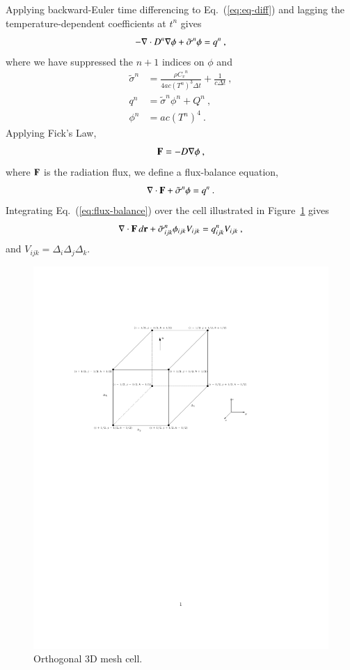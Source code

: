 \documentclass[preprint,12pt]{elsarticle}
\newcommand{\Cv}{\ensuremath{C_{v}}}
\newcommand{\dt}{\ensuremath{\Delta t}}
\newcommand{\sign}{\ensuremath{\tilde{\sigma}^n}}
\newcommand{\qn}{\ensuremath{q^n}} \newcommand{\Tn}{\ensuremath{T^n}}
\newcommand{\Dn}{\ensuremath{D^n}}
\newcommand{\phin}{\ensuremath{\phi^n}}
\begin{document}
Applying backward-Euler time differencing to Eq.~(\ref{eq:eq-diff}) and
lagging the temperature-dependent coefficients at $t^n$ gives
\begin{equation}
  -\nabla\cdot \Dn\grad{\phi} + \sign\phi = \qn\:,
  \label{eq:backwards_euler}
\end{equation}
where we have suppressed the $n+1$ indices on $\phi$ and
\begin{align}
  \sign &= \frac{\rho \Cv^n}{4ac(\Tn)^3\dt} + \frac{1}{c\dt}\:,\\ \qn
  &= \sign\phin + Q^n\:,\\ \phin &= ac(\Tn)^4\:.
\end{align}
Applying Fick's Law,
\begin{equation}
  \mathbf{F} = -D\nabla \phi\:,
  \label{eq:fick}
\end{equation}
where $\mathbf{F}$ is the radiation flux, we define a flux-balance equation,
\begin{equation}
  \dive{F} + \sign\phi = \qn\:.
  \label{eq:flux-balance}
\end{equation}
Integrating Eq.~(\ref{eq:flux-balance}) over the cell illustrated in
Figure~\ref{fig:cell} gives
\begin{equation}
  \iiint\dive{F}\,d\ve{r} +
  \sign_{ijk}\phi_{ijk}V_{ijk}=\qn_{ijk}V_{ijk}\:,
  \label{eq:flux-balance-vol-integral}
\end{equation}
and $V_{ijk} = \Delta_i\Delta_j\Delta_k$.
\begin{figure}[ht!]
  \centerline{ \includegraphics[clip]{mesh_cell.pdf} }
  \caption{Orthogonal 3D mesh cell.}
  \label{fig:cell}
\end{figure}
\end{document}
